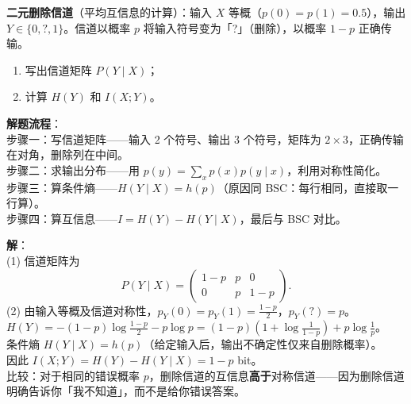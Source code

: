 \begin{example}
\label{ex:ch2-erasure-channel-mutual-information}
\textbf{二元删除信道}（平均互信息的计算）：输入 $X$ 等概（$p(0)=p(1)=0.5$），输出 $Y \in \{0,?,1\}$。信道以概率 $p$ 将输入符号变为「?」（删除），以概率 $1-p$ 正确传输。

\begin{enumerate}
  \item 写出信道矩阵 $P(Y\mid X)$；
  \item 计算 $H(Y)$ 和 $I(X;Y)$。
\end{enumerate}

\noindent \textbf{解题流程}：\\[2pt]
步骤一：写信道矩阵——输入 2 个符号、输出 3 个符号，矩阵为 $2\times3$，正确传输在对角，删除列在中间。\\
步骤二：求输出分布——用 $p(y)=\sum_x p(x)p(y\mid x)$，利用对称性简化。\\
步骤三：算条件熵——$H(Y\mid X)=h(p)$（原因同 BSC：每行相同，直接取一行算）。\\
步骤四：算互信息——$I=H(Y)-H(Y\mid X)$，最后与 BSC 对比。

\textbf{解}：\\[2pt]
(1) 信道矩阵为
\[
P(Y\mid X) = \begin{pmatrix}
1-p & p & 0 \\
0   & p & 1-p
\end{pmatrix}.
\]
(2) 由输入等概及信道对称性，$p_Y(0)=p_Y(1)=\frac{1-p}{2}$，$p_Y(?)=p$。\\
$H(Y)=-(1-p)\log\frac{1-p}{2}-p\log p = (1-p)(1+\log\frac{1}{1-p})+p\log\frac{1}{p}$。\\
条件熵 $H(Y\mid X)=h(p)$（给定输入后，输出不确定性仅来自删除概率）。\\
因此 $I(X;Y)=H(Y)-H(Y\mid X)=1-p$ bit。\\[2pt]
比较：对于相同的错误概率 $p$，删除信道的互信息\textbf{高于}对称信道——因为删除信道明确告诉你「我不知道」，而不是给你错误答案。
\end{example}

